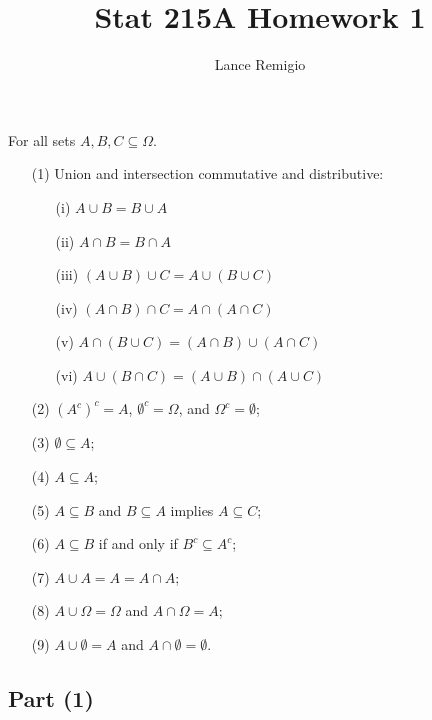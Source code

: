 \documentclass[a4paper]{article}
\title{Stat 215A Homework 1}
\author{Lance Remigio}
\begin{document}
\maketitle   

\begin{prop}[A.1.1]
   For all sets \( A, B , C \subseteq \Omega \). 
   \begin{enumerate}
        \item[(1)] Union and intersection commutative and distributive:
            \begin{enumerate}
                \item[(i)] \( A \cup B   = B \cup A \) 
                \item[(ii)] \( A \cap B = B \cap A  \)
                \item[(iii)] \( (A \cup B) \cup C  = A \cup (B \cup C) \)
                \item[(iv)] \( (A \cap B) \cap C  = A \cap (A \cap C) \)
                \item[(v)] \( A \cap (B \cup C ) = (A \cap B) \cup (A \cap C) \)
                \item[(vi)] \( A \cup (B \cap C) = (A \cup B) \cap (A \cup C) \)
            \end{enumerate}
        \item[(2)] \( (A^{c})^{c} = A  \), \( \emptyset^{c} = \Omega\), and \( \Omega^{c} = \emptyset \);
        \item[(3)] \( \emptyset \subseteq  A  \);
        \item[(4)] \( A \subseteq  A  \);
        \item[(5)] \( A \subseteq  B   \) and \( B \subseteq A  \) implies \( A \subseteq  C  \);
        \item[(6)] \( A \subseteq  B  \) if and only if \( B^{c} \subseteq  A^{c} \);
        \item[(7)] \( A \cup A = A = A \cap A  \);
        \item[(8)] \( A \cup \Omega = \Omega \) and \( A \cap \Omega = A  \);
        \item[(9)] \( A \cup \emptyset = A  \) and \( A \cap \emptyset = \emptyset \).
   \end{enumerate}
\end{prop}

\subsection*{Part (1)}
\end{document}
